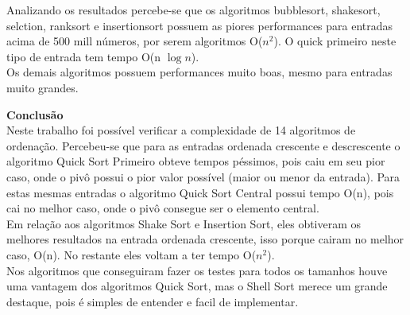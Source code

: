 \documentclass{article}
\begin{document}
\begin{flushleft}
\begin{itemize}
\hspace{10mm} Analizando os resultados percebe-se que os algoritmos bubblesort, shakesort, selction, ranksort e insertionsort possuem as piores performances para entradas acima de 500 mill números, por serem algoritmos O($n^{2}$). O quick primeiro neste tipo de entrada tem tempo O(n $\log n$). \\
\hspace{10mm} Os demais algoritmos possuem performances muito boas, mesmo para entradas muito grandes.
\newpage

\end{itemize}

{\huge \bf Conclusão} \\ [1cm]

\hspace{10 mm} Neste trabalho foi possível verificar a complexidade de 14 algoritmos de ordenação. Percebeu-se que para as entradas ordenada crescente e descrescente o algoritmo Quick Sort Primeiro obteve tempos péssimos, pois caiu em seu pior caso, onde o pivô possui o pior valor possível (maior ou menor da entrada). Para estas mesmas entradas o algoritmo Quick Sort Central possui tempo O(n), pois cai no melhor caso, onde o pivô consegue ser o elemento central. \\
\hspace{10 mm} Em relação aos algoritmos Shake Sort e Insertion Sort, eles obtiveram os melhores resultados na entrada ordenada crescente, isso porque cairam no melhor caso, O(n). No restante eles voltam a ter tempo O($n^{2}$). \\
\hspace{10 mm} Nos algoritmos que conseguiram fazer os testes para todos os tamanhos houve uma vantagem dos algoritmos Quick Sort, mas o Shell Sort merece um grande destaque, pois é simples de entender e facil de implementar.
\end{flushleft}
\end{document}
